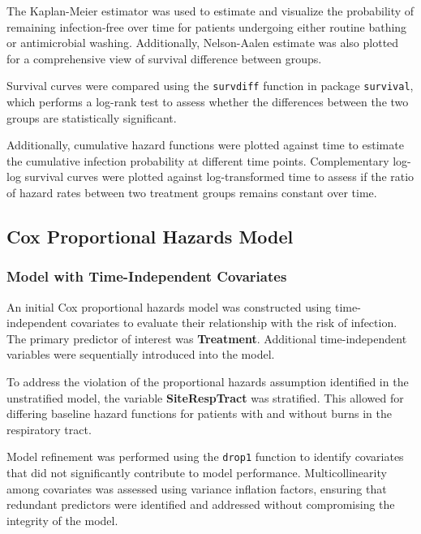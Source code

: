 \documentclass[12pt]{article}
\begin{document}
The Kaplan-Meier estimator was used to estimate and visualize the
probability of remaining infection-free over time for patients
undergoing either routine bathing or antimicrobial washing.
Additionally, Nelson-Aalen estimate was also plotted for a comprehensive
view of survival difference between groups.

Survival curves were compared using the \texttt{survdiff} function in
package \texttt{survival}, which performs a log-rank test to assess
whether the differences between the two groups are statistically
significant.

Additionally, cumulative hazard functions were plotted against time to
estimate the cumulative infection probability at different time points.
Complementary log-log survival curves were plotted against
log-transformed time to assess if the ratio of hazard rates between two
treatment groups remains constant over time.

\subsection{\texorpdfstring{\textbf{Cox Proportional Hazards
Model}}{Cox Proportional Hazards Model}}\label{cox-proportional-hazards-model-1}

\subsubsection{\texorpdfstring{\textbf{Model with Time-Independent
Covariates}}{Model with Time-Independent Covariates}}\label{model-with-time-independent-covariates}

An initial Cox proportional hazards model was constructed using
time-independent covariates to evaluate their relationship with the risk
of infection. The primary predictor of interest was \textbf{Treatment}.
Additional time-independent variables were sequentially introduced into
the model.

To address the violation of the proportional hazards assumption
identified in the unstratified model, the variable
\textbf{SiteRespTract} was stratified. This allowed for differing
baseline hazard functions for patients with and without burns in the
respiratory tract.

Model refinement was performed using the \texttt{drop1} function to
identify covariates that did not significantly contribute to model
performance. Multicollinearity among covariates was assessed using
variance inflation factors, ensuring that redundant predictors were
identified and addressed without compromising the integrity of the
model.
\end{document}
